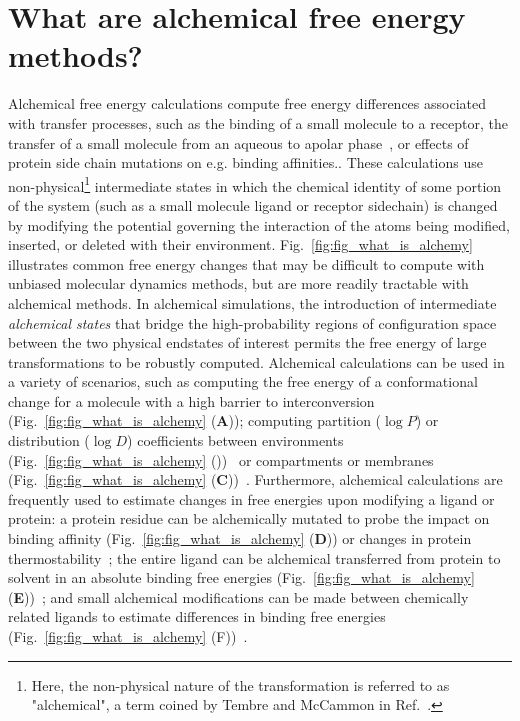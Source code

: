 \documentclass[9pt,bestpractices]{livecoms}
\begin{document}
\section{What are alchemical free energy methods?}
\label{sec:intro}
Alchemical free energy calculations compute free energy differences associated with transfer processes, such as the binding of a small molecule to a receptor, the transfer of a small molecule from an aqueous to apolar phase~\cite{zwanzig1954hightemperature}, or effects of protein side chain mutations on e.g. binding affinities.. 
These calculations use non-physical\footnote{Here, the non-physical nature of the transformation is referred to as "alchemical", a term coined by Tembre and McCammon in Ref.~\cite{tembre1984ligandreceptor}.} intermediate states in which the chemical identity of some portion of the system (such as a small molecule ligand or receptor sidechain) is changed by modifying the potential governing the interaction of the atoms being modified, inserted, or deleted with their environment. 
%
Fig.~\ref{fig:fig_what_is_alchemy} illustrates common free energy changes that may be difficult to compute with unbiased molecular dynamics methods, but are more readily tractable with alchemical methods.
In alchemical simulations, the introduction of intermediate \textit{alchemical states} that bridge the high-probability regions of configuration space between the two physical endstates of interest permits the free energy of large transformations to be robustly computed.
Alchemical calculations can be used in a variety of scenarios, such as computing the free energy of a conformational change for a molecule with a high barrier to interconversion (Fig.~\ref{fig:fig_what_is_alchemy} (\textbf{A})); 
computing partition ($\log P$) or distribution ($\log D$) coefficients between environments (Fig.~\ref{fig:fig_what_is_alchemy} ())~\cite{rustenburg2016measuring, bosisio2016blinded} or compartments or membranes (Fig.~\ref{fig:fig_what_is_alchemy} (\textbf{C}))~\cite{corey2019insights}. 
Furthermore, alchemical calculations are frequently used to estimate changes in free energies upon modifying a ligand or protein: a protein residue can be alchemically mutated to probe the impact on binding affinity (Fig.~\ref{fig:fig_what_is_alchemy} (\textbf{D}))\cite{hauser2018predicting,aldeghi2018accurate} or changes in protein thermostability~\cite{seeliger2010protein,gapsys2016insights,gapsys2016accurate,aldeghi2019accurate}; the entire ligand can be alchemical transferred from protein to solvent in an absolute binding free energies (Fig.~\ref{fig:fig_what_is_alchemy} (\textbf{E}))~\cite{mobley2007predicting,aldeghi2015accurate,aldeghi2017predictions}; and small alchemical modifications can be made between chemically related ligands to estimate differences in binding free energies (Fig.~\ref{fig:fig_what_is_alchemy} (F))~\cite{wang2015accurate,mey2016blinded,gapsys2020large}.
\end{document}
